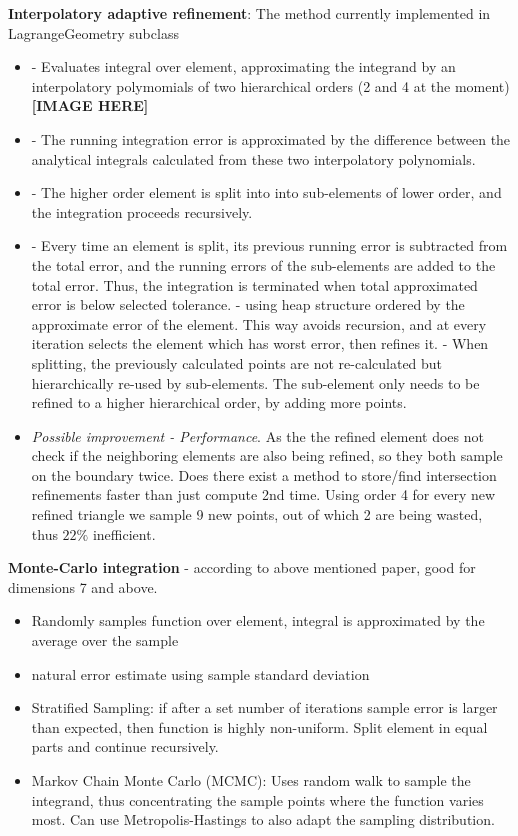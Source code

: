 \noindent
\textbf{Interpolatory adaptive refinement}: The method currently implemented in LagrangeGeometry subclass
\begin{itemize}
	\item - Evaluates integral over element, approximating the integrand by an interpolatory polymomials of two hierarchical orders (2 and 4 at the moment) \textbf{[IMAGE HERE]}
	\item - The running integration error is approximated by the difference between the analytical integrals calculated from these two interpolatory polynomials.
	\item - The higher order element is split into into sub-elements of lower order, and the integration proceeds recursively.
	\item - Every time an element is split, its previous running error is subtracted from the total error, and the running errors of the sub-elements are added to the total error. Thus, the integration is terminated when total approximated error is below selected tolerance. 	
		\subitem - using heap structure ordered by the approximate error of the element. This way avoids recursion, and at every iteration selects the element which has worst error, then refines it.
		\subitem - When splitting, the previously calculated points are not re-calculated but hierarchically re-used by sub-elements. The sub-element only needs to be refined to a higher hierarchical order, by adding more points.
	\item \textit{Possible improvement - Performance}. As the the refined element does not check if the neighboring elements are also being refined, so they both sample on the boundary twice. Does there exist a method to store/find intersection refinements faster than just compute 2nd time. Using order 4 for every new refined triangle we sample 9 new points, out of which 2 are being wasted, thus $22\%$ inefficient.
\end{itemize}

\noindent
\textbf{Monte-Carlo integration} - according to above mentioned paper, good for dimensions 7 and above.
\begin{itemize}
	\item Randomly samples function over element, integral is approximated by the average over the sample
	\item natural error estimate using sample standard deviation
	\item Stratified Sampling: if after a set number of iterations sample error is larger than expected, then function is highly non-uniform. Split element in equal parts and continue recursively.
	\item Markov Chain Monte Carlo (MCMC): Uses random walk to sample the integrand, thus concentrating the sample points where the function varies most. Can use Metropolis-Hastings to also adapt the sampling distribution.
\end{itemize}

